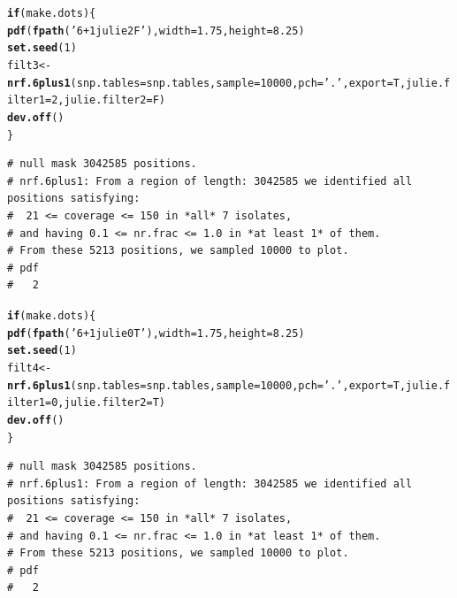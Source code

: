 \documentclass{article}\usepackage[]{graphicx}\usepackage[]{color}
\makeatletter
\newcommand{\hlnum}[1]{\textcolor[rgb]{0.686,0.059,0.569}{#1}}%
\newcommand{\hlstr}[1]{\textcolor[rgb]{0.192,0.494,0.8}{#1}}%
\newcommand{\hlstd}[1]{\textcolor[rgb]{0.345,0.345,0.345}{#1}}%
\newcommand{\hlkwa}[1]{\textcolor[rgb]{0.161,0.373,0.58}{\textbf{#1}}}%
\newcommand{\hlkwb}[1]{\textcolor[rgb]{0.69,0.353,0.396}{#1}}%
\newcommand{\hlkwc}[1]{\textcolor[rgb]{0.333,0.667,0.333}{#1}}%
\newcommand{\hlkwd}[1]{\textcolor[rgb]{0.737,0.353,0.396}{\textbf{#1}}}%
\newenvironment{kframe}{%
 \def\at@end@of@kframe{}%
 \ifinner\ifhmode%
  \def\at@end@of@kframe{\end{minipage}}%
  \begin{minipage}{\columnwidth}%
 \fi\fi%
 \def\FrameCommand##1{\hskip\@totalleftmargin \hskip-\fboxsep
 \colorbox{shadecolor}{##1}\hskip-\fboxsep
     \hskip-\linewidth \hskip-\@totalleftmargin \hskip\columnwidth}%
 \MakeFramed {\advance\hsize-\width
   \@totalleftmargin\z@ \linewidth\hsize
   \@setminipage}}%
 {\par\unskip\endMakeFramed%
 \at@end@of@kframe}
\newenvironment{knitrout}{}{} %
\makeatother
\begin{document}
\begin{knitrout}\footnotesize
{}\color{fgcolor}\begin{kframe}
\begin{alltt}
\hlkwa{if}\hlstd{(make.dots)\{}
  \hlkwd{pdf}\hlstd{(}\hlkwd{fpath}\hlstd{(}\hlstr{'6+1julie2F'}\hlstd{),} \hlkwc{width}\hlstd{=}\hlnum{1.75}\hlstd{,} \hlkwc{height}\hlstd{=}\hlnum{8.25}\hlstd{)}
  \hlkwd{set.seed}\hlstd{(}\hlnum{1}\hlstd{)}
  \hlstd{filt3} \hlkwb{<-} \hlkwd{nrf.6plus1}\hlstd{(}\hlkwc{snp.tables}\hlstd{=snp.tables,}\hlkwc{sample}\hlstd{=}\hlnum{10000}\hlstd{,}\hlkwc{pch}\hlstd{=}\hlstr{'.'}\hlstd{,}\hlkwc{export}\hlstd{=T,}\hlkwc{julie.filter1}\hlstd{=}\hlnum{2}\hlstd{,}\hlkwc{julie.filter2}\hlstd{=F)}
  \hlkwd{dev.off}\hlstd{()}
\hlstd{\}}
\end{alltt}
\begin{verbatim}
# null mask 3042585 positions.
# nrf.6plus1: From a region of length: 3042585 we identified all positions satisfying: 
#  21 <= coverage <= 150 in *all* 7 isolates, 
# and having 0.1 <= nr.frac <= 1.0 in *at least 1* of them. 
# From these 5213 positions, we sampled 10000 to plot.
# pdf 
#   2
\end{verbatim}
\end{kframe}
\end{knitrout}
\begin{knitrout}\footnotesize
{}\color{fgcolor}\begin{kframe}
\begin{alltt}
\hlkwa{if}\hlstd{(make.dots)\{}
  \hlkwd{pdf}\hlstd{(}\hlkwd{fpath}\hlstd{(}\hlstr{'6+1julie0T'}\hlstd{),} \hlkwc{width}\hlstd{=}\hlnum{1.75}\hlstd{,} \hlkwc{height}\hlstd{=}\hlnum{8.25}\hlstd{)}
  \hlkwd{set.seed}\hlstd{(}\hlnum{1}\hlstd{)}
  \hlstd{filt4} \hlkwb{<-} \hlkwd{nrf.6plus1}\hlstd{(}\hlkwc{snp.tables}\hlstd{=snp.tables,}\hlkwc{sample}\hlstd{=}\hlnum{10000}\hlstd{,}\hlkwc{pch}\hlstd{=}\hlstr{'.'}\hlstd{,}\hlkwc{export}\hlstd{=T,}\hlkwc{julie.filter1}\hlstd{=}\hlnum{0}\hlstd{,}\hlkwc{julie.filter2}\hlstd{=T)}
  \hlkwd{dev.off}\hlstd{()}
\hlstd{\}}
\end{alltt}
\begin{verbatim}
# null mask 3042585 positions.
# nrf.6plus1: From a region of length: 3042585 we identified all positions satisfying: 
#  21 <= coverage <= 150 in *all* 7 isolates, 
# and having 0.1 <= nr.frac <= 1.0 in *at least 1* of them. 
# From these 5213 positions, we sampled 10000 to plot.
# pdf 
#   2
\end{verbatim}
\end{kframe}
\end{knitrout}
\end{document}

